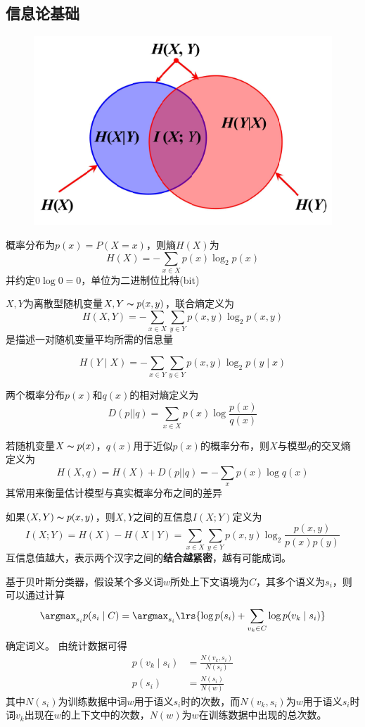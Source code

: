 \subsection{信息论基础}
\begin{figure}[H]
\centering
\includegraphics[width=0.4\linewidth]{fig/entropy.png}
\end{figure}
\begin{definition}[熵/自信息]
概率分布为$p(x)=P(X=x)$，则熵$H(X)$为
\[H(X)=-\sum_{x\in X}p(x)\log_2p(x)\]
并约定$0\log 0=0$，单位为二进制位比特(bit)
\end{definition}
\begin{definition}[联合熵]
$X,Y$为离散型随机变量$X,Y\thicksim p(x,y)$，联合熵定义为
\[H(X,Y)=-\sum_{x\in X}\sum_{y\in Y}p(x,y)\log_2 p(x,y)\]
是描述一对随机变量平均所需的信息量
\end{definition}
\begin{definition}[条件熵]
\[H(Y\mid X)=-\sum_{x\in Y}\sum_{y\in Y}p(x,y)\log_2 p(y\mid x)\]
\end{definition}
\begin{definition}
两个概率分布$p(x)$和$q(x)$的相对熵定义为
\[D(p||q)=\sum_{x\in X}p(x)\log\frac{p(x)}{q(x)}\]
\end{definition}
\begin{definition}[交叉熵]
若随机变量$X\thicksim p(x)$，$q(x)$用于近似$p(x)$的概率分布，则$X$与模型$q$的交叉熵定义为
\[H(X,q)=H(X)+D(p||q)=-\sum_x p(x)\log q(x)\]
其常用来衡量估计模型与真实概率分布之间的差异
\end{definition}
\begin{definition}[互信息]
如果$(X,Y)\thicksim p(x,y)$，则$X,Y$之间的互信息$I(X;Y)$定义为
\[I(X;Y)=H(X)-H(X\mid Y)=\sum_{x\in X}\sum_{y\in Y}p(x,y)\log_2\frac{p(x,y)}{p(x)p(y)}\]
互信息值越大，表示两个汉字之间的\textbf{结合越紧密}，越有可能成词。
\end{definition}

\begin{example}[基于上下文分类的消歧方法]
基于贝叶斯分类器，假设某个多义词$w$所处上下文语境为$C$，其多个语义为$s_i$，则可以通过计算
\[\argmax_{s_i} p(s_i\mid C)=\argmax_{s_i}\lrs{\log p(s_i)+\sum_{v_k\in C}\log p(v_k\mid s_i)}\]
确定词义。
由统计数据可得
\[\begin{aligned}
p(v_k\mid s_i)&=\frac{N(v_k,s_i)}{N(s_i)}\\
p(s_i)&=\frac{N(s_i)}{N(w)}
\end{aligned}\]
其中$N(s_i)$为训练数据中词$w$用于语义$s_i$时的次数，而$N(v_k,s_i)$为$w$用于语义$s_i$时词$v_k$出现在$w$的上下文中的次数，$N(w)$为$w$在训练数据中出现的总次数。
\end{example}

